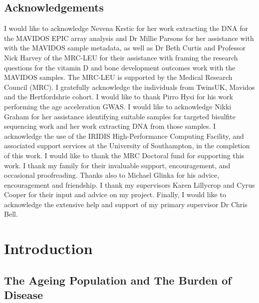 \documentclass[
]{book}
\begin{document}
\newpage

\hypertarget{acknowledgements}{%
\section*{Acknowledgements}\label{acknowledgements}}

I would like to acknowledge Nevena Krstic for her work extracting the DNA for the MAVIDOS EPIC array analysis and Dr Millie Parsons for her assistance with with the MAVIDOS sample metadata, as well as Dr Beth Curtis and Professor Nick Harvey of the MRC-LEU for their assistance with framing the research questions for the vitamin D and bone development outcomes work with the MAVIDOS samples.
The MRC-LEU is supported by the Medical Research Council (MRC).
I gratefully acknowledge the individuals from TwinsUK, Mavidos and the Hertfordshrie cohort.
I would like to thank Pirro Hysi for his work performing the age acceleration GWAS.
I would like to acknowledge Nikki Graham for her assistance identifying suitable samples for targeted bisulfite sequencing work and her work extracting DNA from those samples.
I acknowledge the use of the IRIDIS High-Performance Computing Facility, and associated support services at the University of Southampton, in the completion of this work.
I would like to thank the MRC Doctoral fund for supporting this work.
I thank my family for their invaluable support, encouragement, and occasional proofreading.
Thanks also to Michael Glinka for his advice, encouragement and friendship.
I thank my supervisors Karen Lillycrop and Cyrus Cooper for their input and advice on my project.
Finally, I would like to acknowledge the extensive help and support of my primary supervisor Dr Chris Bell.

{
\hypersetup{linkcolor=}
\setcounter{tocdepth}{4}
\tableofcontents
}
\newpage

\hypertarget{introduction}{%
\chapter{Introduction}\label{introduction}}

\hypertarget{the-ageing-population-and-the-burden-of-disease}{%
\section{The Ageing Population and The Burden of Disease}\label{the-ageing-population-and-the-burden-of-disease}}
\end{document}
